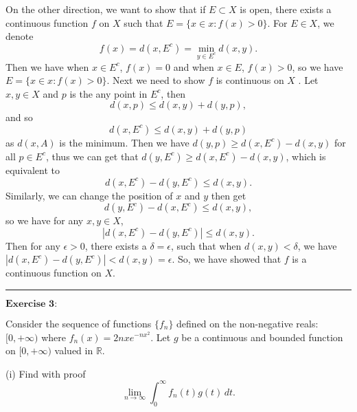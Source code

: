 \documentclass[12pt,a4paper]{ctexart}
\begin{document}
On the other direction, we want to show that if $E \subset X$ is open, there exists a continuous function $f$ on $X$ such that $E = \{x \in x : f(x) > 0 \}$. For $E \in X$, we denote
\begin{equation*}
    f(x) = d(x, E^{c}) = \min_{y \in E^{c}} d(x, y).
\end{equation*}
Then we have when $x \in E^{c}$, $f(x) = 0$ and when $x \in E$, $f(x) > 0$, so we have $E = \{x \in x : f(x) > 0 \}$. Next we need to show $f$ is continuous on $X$ . Let $x, y \in X$ and $p$ is the any point in $E^{c}$, then
\begin{equation*}
    d(x, p) \leq d(x, y) + d(y, p),
\end{equation*}
and so
\begin{equation*}
    d(x, E^{c}) \leq d(x, y) + d(y, p)
\end{equation*}
as $d(x, A)$ is the minimum. Then we have $d(y, p) \geq d(x, E^{c}) - d(x, y)$ for all $p \in E^{c}$, thus we can get that $d(y, E^{c}) \geq d(x, E^{c}) - d(x, y)$, which is equivalent to
\begin{equation*}
    d(x, E^{c}) - d(y, E^{c}) \leq d(x, y).
\end{equation*}
Similarly, we can change the position of $x$ and $y$ then get
\begin{equation*}
    d(y, E^{c}) - d(x, E^{c}) \leq d(x, y),
\end{equation*}
so we have for any $x, y \in X$,
\begin{equation*}
    | d(x, E^{c}) - d(y, E^{c})| \leq d(x, y).
\end{equation*}
Then for any $\epsilon > 0$, there exists a $\delta = \epsilon$, such that when $d(x, y) < \delta$, we have $|d(x, E^{c}) - d(y, E^{c})| < d(x, y) = \epsilon$. So, we have showed that $f$ is a continuous function on $X$.

\noindent\rule[0.25\baselineskip]{\textwidth}{0.5pt}

\vspace{8pt}

$\textbf{Exercise 3:}$

Consider the sequence of functions $\{f_{n}\}$ defined on the non-negative reals: $[0, + \infty)$ where $f_{n}(x) = 2 n x e^{-n x^{2}}$. Let $g$ be a continuous and bounded function on $[0, + \infty)$ valued in $\mathbb{R}$.

(i) Find with proof
\begin{equation*}
   \lim_{n \to \infty} \int_{0}^{\infty} f_{n}(t) g(t) \, d t.
\end{equation*}
\end{document}
